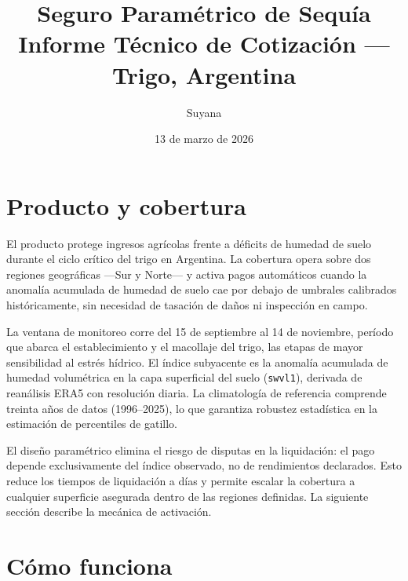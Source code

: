 \documentclass[11pt,a4paper]{article}
\begin{document}
\title{\textbf{Seguro Paramétrico de Sequía}\\[0.4em]
\large Informe Técnico de Cotización --- Trigo, Argentina}
\author{Suyana}
\date{13 de marzo de 2026}
\maketitle

\tableofcontents
\newpage

\section{Producto y cobertura}

El producto protege ingresos agrícolas frente a déficits de humedad de suelo durante el ciclo crítico del trigo en Argentina. La cobertura opera sobre dos regiones geográficas ---Sur y Norte--- y activa pagos automáticos cuando la anomalía acumulada de humedad de suelo cae por debajo de umbrales calibrados históricamente, sin necesidad de tasación de daños ni inspección en campo.

La ventana de monitoreo corre del 15 de septiembre al 14 de noviembre, período que abarca el establecimiento y el macollaje del trigo, las etapas de mayor sensibilidad al estrés hídrico. El índice subyacente es la anomalía acumulada de humedad volumétrica en la capa superficial del suelo (\texttt{swvl1}), derivada de reanálisis ERA5 con resolución diaria. La climatología de referencia comprende treinta años de datos (1996--2025), lo que garantiza robustez estadística en la estimación de percentiles de gatillo.

El diseño paramétrico elimina el riesgo de disputas en la liquidación: el pago depende exclusivamente del índice observado, no de rendimientos declarados. Esto reduce los tiempos de liquidación a días y permite escalar la cobertura a cualquier superficie asegurada dentro de las regiones definidas. La siguiente sección describe la mecánica de activación.

\section{Cómo funciona}
\end{document}

